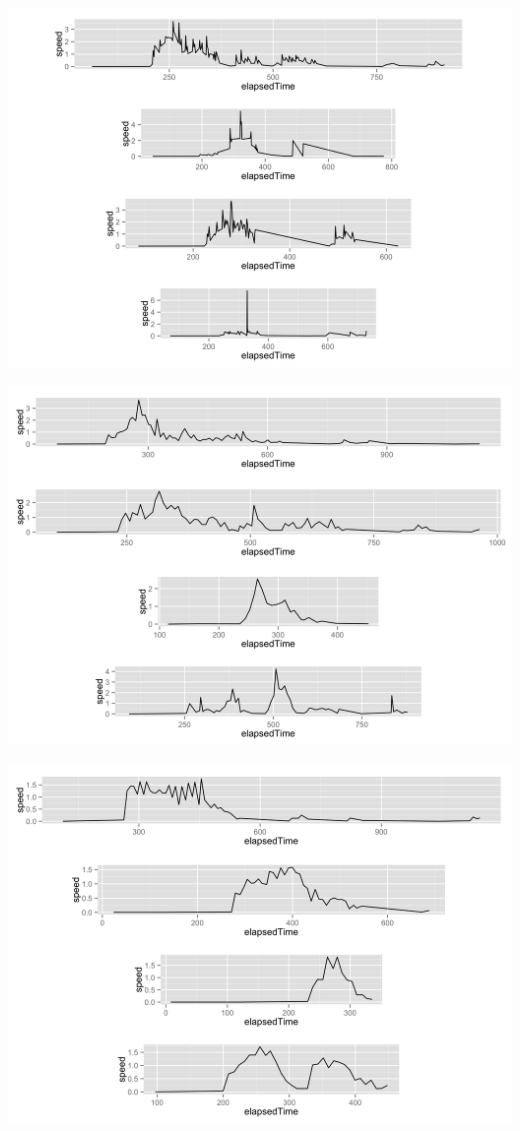 \begin{appendices}
\begin{minipage}{\textwidth}
	\begin{minipage}{0.5\linewidth}
		\includegraphics[width=\linewidth]{images/plots/plot_speed_time_individual_45}
	\end{minipage}
		\begin{minipage}{0.5\linewidth}
		\includegraphics[width=\linewidth]{images/plots/plot_speed_time_individual_77}
	\end{minipage}
	\begin{minipage}{0.5\linewidth}
		\includegraphics[width=\linewidth]{images/plots/plot_speed_time_individual_113}

\end{minipage}
\end{minipage}
\end{appendices}
